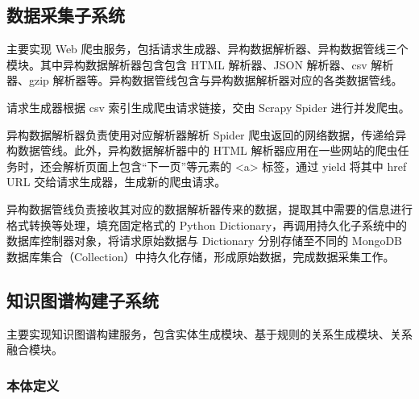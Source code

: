 \documentclass[a4paper,AutoFakeBold,oneside,12pt]{book}
\begin{document}
\subsection{数据采集子系统}

主要实现 Web 爬虫服务，包括请求生成器、异构数据解析器、异构数据管线三个模块。其中异构数据解析器包含包含 HTML 解析器、JSON 解析器、csv 解析器、gzip 解析器等。异构数据管线包含与异构数据解析器对应的各类数据管线。

请求生成器根据 csv 索引生成爬虫请求链接，交由 Scrapy Spider 进行并发爬虫。

异构数据解析器负责使用对应解析器解析 Spider 爬虫返回的网络数据，传递给异构数据管线。此外，异构数据解析器中的 HTML 解析器应用在一些网站的爬虫任务时，还会解析页面上包含``下一页''等元素的 <a> 标签，通过 yield 将其中 href URL 交给请求生成器，生成新的爬虫请求。

异构数据管线负责接收其对应的数据解析器传来的数据，提取其中需要的信息进行格式转换等处理，填充固定格式的 Python Dictionary，再调用持久化子系统中的数据库控制器对象，将请求原始数据与 Dictionary 分别存储至不同的 MongoDB 数据库集合（Collection）中持久化存储，形成原始数据，完成数据采集工作。

\subsection{知识图谱构建子系统\label{知识图谱构建子系统}}

主要实现知识图谱构建服务，包含实体生成模块、基于规则的关系生成模块、关系融合模块。

\subsubsection{本体定义\label{本体定义}}
\end{document}
